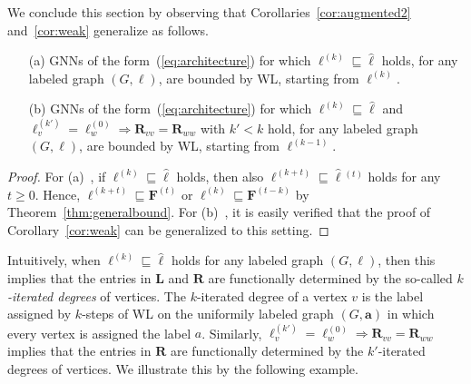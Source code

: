 We conclude this section by observing that Corollaries~\ref{cor:augmented2} and~\ref{cor:weak} generalize as follows. 
\begin{corollary}\phantom{This is just a dummy line}
\begin{itemize}
\item[(a)] GNNs of the form~(\ref{eq:architecture}) for which 
	$\pmb{\ell}^{(k)}\sqsubseteq\hat{\pmb{\ell}}$  holds,
 for any labeled graph $(G,\pmb{\ell})$, are bounded by WL, starting from $\pmb{\ell}^{(k)}$.
\item[(b)] GNNs of the form~(\ref{eq:architecture}) for which 
	$\pmb{\ell}^{(k)}\sqsubseteq\hat{\pmb{\ell}}$  and
	$\pmb{\ell}^{(k')}_v=\pmb{\ell}^{(0)}_w\Rightarrow \mathbf{R}_{vv}=\mathbf{R}_{ww}$ with $k'<k$ hold,
 for any labeled graph $(G,\pmb{\ell})$, are bounded by WL, starting from $\pmb{\ell}^{(k-1)}$.
\end{itemize}	
\end{corollary}
%
\begin{proof}
	For (a)~, if 	$\pmb{\ell}^{(k)}\sqsubseteq\hat{\pmb{\ell}}$ holds, then also 
$\pmb{\ell}^{(k+t)}\sqsubseteq\hat{\pmb{\ell}}{}^{(t)}$ holds for any $t\geq 0$. Hence,
$\pmb{\ell}^{(k+t)}\sqsubseteq \mathbf{F}^{(t)}$ or $\pmb{\ell}^{(k)}\sqsubseteq\mathbf{F}^{(t-k)}$ by Theorem~\ref{thm:generalbound}.
For (b)~, it is easily verified that the proof of Corollary~\ref{cor:weak} can be generalized to this setting.
\end{proof}
Intuitively, when $\pmb{\ell}^{(k)}\sqsubseteq\hat{\pmb{\ell}}$ holds for any labeled graph $(G,\pmb{\ell})$, then this implies that the entries in $\mathbf{L}$ and $\mathbf{R}$ are functionally determined by the so-called \textit{$k$-iterated degrees} of vertices. The $k$-iterated degree of a vertex $v$ is the label assigned by $k$-steps of  WL on the uniformily labeled graph $(G,\pmb{a})$ in which every vertex is assigned the label $a$.
Similarly, $\pmb{\ell}^{(k')}_v=\pmb{\ell}^{(0)}_w\Rightarrow \mathbf{R}_{vv}=\mathbf{R}_{ww}$ implies that the entries in $\mathbf{R}$ are functionally determined by the $k'$-iterated degrees of vertices. We illustrate this by the following example.
\begin{example}
\end{example}

